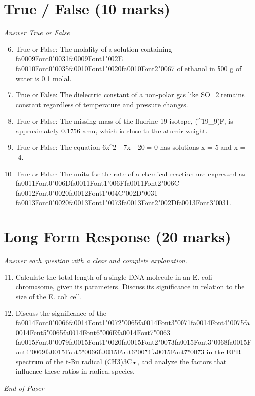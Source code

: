 \documentclass[12pt]{article}
\begin{document}
\section*{True / False (10 marks)}
\textit{Answer True or False}
\begin{enumerate}[label=\arabic*.]
\setcounter{enumi}{5}
\item True or False: The molality of a solution containing {\csname fa0009Font0\endcsname\char"0031}{\csname fa0009Font1\endcsname\char"002E} {\csname fa0010Font0\endcsname\char"0035}{\csname fa0010Font1\endcsname\char"0020}{\csname fa0010Font2\endcsname\char"0067} of ethanol in 500 g of water is 0.1 molal.
\item True or False: The dielectric constant of a non-polar gas like SO\_2 remains constant regardless of temperature and pressure changes.
\item True or False: The missing mass of the fluorine-19 isotope, (\^{}19\_9)F, is approximately 0.1756 amu, which is close to the atomic weight.
\item True or False: The equation 6x\^{}2 - 7x - 20 = 0 has solutions x = 5 and x = -4.
\item True or False: The units for the rate of a chemical reaction are expressed as {\csname fa0011Font0\endcsname\char"006D}{\csname fa0011Font1\endcsname\char"006F}{\csname fa0011Font2\endcsname\char"006C} {\csname fa0012Font0\endcsname\char"0020}{\csname fa0012Font1\endcsname\char"004C}{\char"002D}{\char"0031} {\csname fa0013Font0\endcsname\char"0020}{\csname fa0013Font1\endcsname\char"0073}{\csname fa0013Font2\endcsname\char"002D}{\csname fa0013Font3\endcsname\char"0031}.
\end{enumerate}

\section*{Long Form Response (20 marks)}
\textit{Answer each question with a clear and complete explanation.}
\begin{enumerate}[label=\arabic*.]
\setcounter{enumi}{10}
\item Calculate the total length of a single DNA molecule in an E. coli chromosome, given its
parameters. Discuss its significance in relation to the size of the E. coli cell.
\item Discuss the significance of the {\csname fa0014Font0\endcsname\char"0066}{\csname fa0014Font1\endcsname\char"0072}{\char"0065}{\csname fa0014Font3\endcsname\char"0071}{\csname fa0014Font4\endcsname\char"0075}{\csname fa0014Font5\endcsname\char"0065}{\csname fa0014Font6\endcsname\char"006E}{\csname fa0014Font7\endcsname\char"0063} {\csname fa0015Font0\endcsname\char"0079}{\csname fa0015Font1\endcsname\char"0020}{\csname fa0015Font2\endcsname\char"0073}{\csname fa0015Font3\endcsname\char"0068}{\csname fa0015Font4\endcsname\char"0069}{\csname fa0015Font5\endcsname\char"0066}{\csname fa0015Font6\endcsname\char"0074}{\csname fa0015Font7\endcsname\char"0073} in the EPR spectrum of the t-Bu radical
(CH3)3C•, and analyze the factors that influence these ratios in radical species.
\end{enumerate}

\vfill
\noindent\textit{End of Paper}
\end{document}
